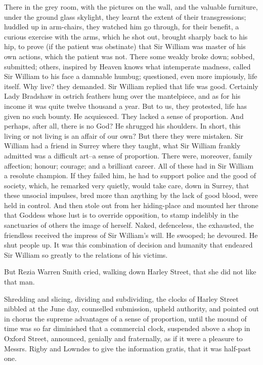 \documentclass[lang=cn,10pt]{elegantbook}
\begin{document}
There in the grey room, with the pictures on the wall, and the
valuable furniture, under the ground glass skylight, they learnt
the extent of their transgressions; huddled up in arm-chairs, they
watched him go through, for their benefit, a curious exercise with
the arms, which he shot out, brought sharply back to his hip, to
prove (if the patient was obstinate) that Sir William was master of
his own actions, which the patient was not.  There some weakly
broke down; sobbed, submitted; others, inspired by Heaven knows
what intemperate madness, called Sir William to his face a damnable
humbug; questioned, even more impiously, life itself.  Why live?
they demanded.  Sir William replied that life was good.  Certainly
Lady Bradshaw in ostrich feathers hung over the mantelpiece, and as
for his income it was quite twelve thousand a year.  But to us,
they protested, life has given no such bounty.  He acquiesced.
They lacked a sense of proportion.  And perhaps, after all, there
is no God?  He shrugged his shoulders.  In short, this living or
not living is an affair of our own?  But there they were mistaken.
Sir William had a friend in Surrey where they taught, what Sir
William frankly admitted was a difficult art--a sense of
proportion.  There were, moreover, family affection; honour;
courage; and a brilliant career.  All of these had in Sir William a
resolute champion.  If they failed him, he had to support police
and the good of society, which, he remarked very quietly, would
take care, down in Surrey, that these unsocial impulses, bred more
than anything by the lack of good blood, were held in control.  And
then stole out from her hiding-place and mounted her throne that
Goddess whose lust is to override opposition, to stamp indelibly
in the sanctuaries of others the image of herself.  Naked,
defenceless, the exhausted, the friendless received the impress of
Sir William's will.  He swooped; he devoured.  He shut people up.
It was this combination of decision and humanity that endeared Sir
William so greatly to the relations of his victims.

But Rezia Warren Smith cried, walking down Harley Street, that she
did not like that man.

Shredding and slicing, dividing and subdividing, the clocks of
Harley Street nibbled at the June day, counselled submission,
upheld authority, and pointed out in chorus the supreme advantages
of a sense of proportion, until the mound of time was so far
diminished that a commercial clock, suspended above a shop in
Oxford Street, announced, genially and fraternally, as if it were a
pleasure to Messrs. Rigby and Lowndes to give the information
gratis, that it was half-past one.
\end{document}
